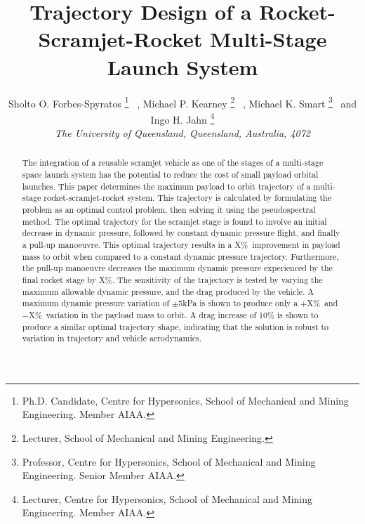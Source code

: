 \documentclass[]{aiaa-tc}
\newcommand{\PayloadImprovement}{X\%}
\newcommand{\qDecrease}{X\%}
\newcommand{\qVariationPlus}{$+$X\%}
\newcommand{\qVariationMinus}{$-$X\%}
\begin{document}

\title{Trajectory Design of a Rocket-Scramjet-Rocket Multi-Stage Launch System} %




 \author{
 	Sholto O. Forbes-Spyratos%
 	\thanks{Ph.D. Candidate, Centre for Hypersonics, School of Mechanical and Mining Engineering. Member AIAA.}
 	\ ,  Michael P. Kearney
 	\thanks{Lecturer, School of Mechanical and Mining Engineering.}
 	\ ,  Michael K. Smart
 	\thanks{Professor, Centre for Hypersonics, School of Mechanical and Mining Engineering. Senior Member AIAA.}
 	\ and   Ingo H. Jahn
 	\thanks{Lecturer, Centre for Hypersonics, School of Mechanical and Mining Engineering. Member AIAA.}
 	\\
 	{\normalsize\itshape
 		The University of Queensland, Queensland, Australia, 4072}\\
 }





\begin{abstract}

The integration of a reusable scramjet vehicle as one of the stages of a multi-stage space launch system has the potential to reduce the cost of small payload orbital launches. 
This paper determines the maximum payload to orbit trajectory of a multi-stage rocket-scramjet-rocket system. This trajectory is calculated by formulating the problem as an optimal control problem, then solving it using the pseudospectral method. 
The optimal trajectory for the scramjet stage is found to involve an initial decrease in dynamic pressure, followed by constant dynamic pressure flight, and finally a pull-up manoeuvre. This optimal trajectory results in a \PayloadImprovement\ improvement in payload mass to orbit when compared to a constant dynamic pressure trajectory. 
Furthermore, the pull-up manoeuvre decreases the maximum dynamic pressure experienced by the final rocket stage by \qDecrease. 
The sensitivity of the trajectory is tested by varying the maximum allowable dynamic pressure, and the drag produced by the vehicle. 
A maximum dynamic pressure variation of $\pm$5kPa is shown to produce only a \qVariationPlus\ and \qVariationMinus\ variation in the payload mass to orbit. A drag increase of 10\% is shown to produce a similar optimal trajectory shape, indicating that the solution is robust to variation in trajectory and vehicle aerodynamics. 


\end{abstract}
\maketitle
\end{document}
